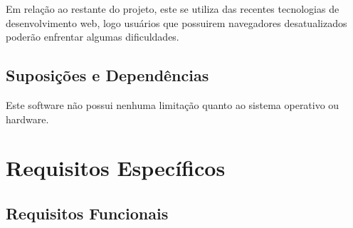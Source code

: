 \documentclass[12pt,a4paper,onecolumn,titlepage]{article}
\begin{document}
Em relação ao restante do projeto, este se utiliza das recentes tecnologias de desenvolvimento web, logo usuários que possuirem navegadores desatualizados poderão enfrentar algumas dificuldades.

\subsection{Suposições e Dependências}

Este software não possui nenhuma limitação quanto ao sistema operativo ou hardware.

\section{Requisitos Específicos}
\label{sect:requisitos}


\subsection{Requisitos Funcionais}
\end{document}
